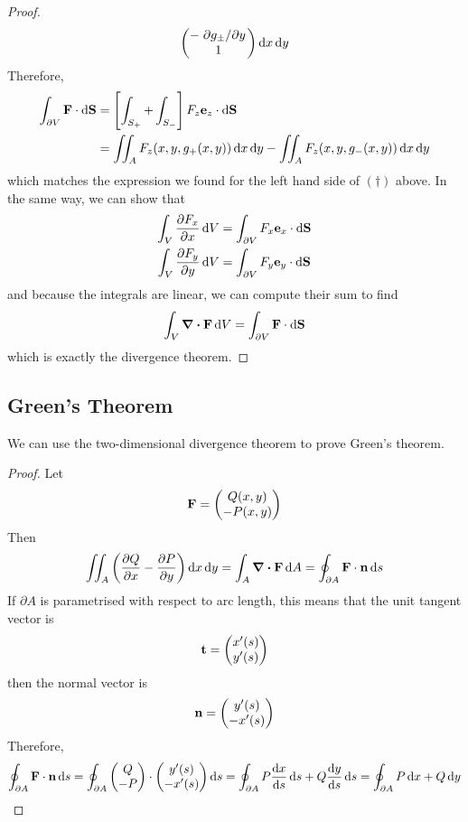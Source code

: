 \begin{proof}
\[\begin{pmatrix}
			-\pdv*{g_\pm}{y} \\
			1                \\
		\end{pmatrix} \dd{x}\dd{y}
	\]
	Therefore,
	\begin{align*}
		\int_{\partial V} \vb F \cdot \dd{\vb S} & = \left[ \int_{S_+} + \int_{S_-} \right] F_z \vb e_z \cdot \dd{\vb S}                   \\
		                                         & = \iint_A F_z(x, y, g_+(x, y)) \dd{x}\dd{y} - \iint_A F_z(x, y, g_-(x, y)) \dd{x}\dd{y}
	\end{align*}
	which matches the expression we found for the left hand side of \((\dagger)\) above.
	In the same way, we can show that
	\begin{align*}
		\int_V \pdv{F_x}{x} \dd{V} & = \int_{\partial V} F_x \vb e_x \cdot \dd{\vb S} \\
		\int_V \pdv{F_y}{y} \dd{V} & = \int_{\partial V} F_y \vb e_y \cdot \dd{\vb S} \\
	\end{align*}
	and because the integrals are linear, we can compute their sum to find
	\[
		\int_V \div{\vb F} \dd{V} = \int_{\partial V} \vb F \cdot \dd{\vb S}
	\]
	which is exactly the divergence theorem.
\end{proof}

\subsection{Green's Theorem}
We can use the two-dimensional divergence theorem to prove Green's theorem.
\begin{proof}
	Let
	\[
		\vb F = \begin{pmatrix}
			Q(x, y) \\ -P(x, y)
		\end{pmatrix}
	\]
	Then
	\[
		\iint_A \left( \pdv{Q}{x} - \pdv{P}{y} \right) \dd{x}\dd{y} = \int_A \div{\vb F} \dd{A} = \oint_{\partial A} \vb F \cdot \vb n \dd{s}
	\]
	If \(\partial A\) is parametrised with respect to arc length, this means that the unit tangent vector is
	\[
		\vb t = \begin{pmatrix}
			x'(s) \\ y'(s)
		\end{pmatrix}
	\]
	then the normal vector is
	\[
		\vb n = \begin{pmatrix}
			y'(s) \\ -x'(s)
		\end{pmatrix}
	\]
	Therefore,
	\[
		\oint_{\partial A} \vb F \cdot \vb n \dd{s} = \oint_{\partial A} \begin{pmatrix}
			Q \\ -P
		\end{pmatrix} \cdot \begin{pmatrix}
			y'(s) \\ -x'(s)
		\end{pmatrix} \dd{s} = \oint_{\partial A} P \dv{x}{s} \dd{s} + Q \dv{y}{s} \dd{s} = \oint_{\partial A} P \dd{x} + Q \dd{y}
	\]
\end{proof}

